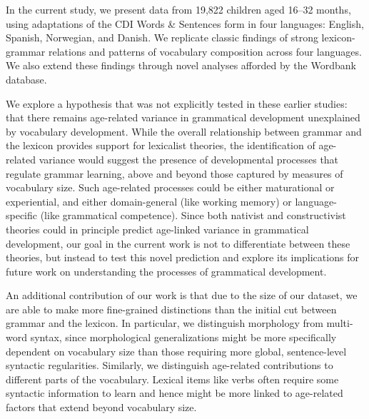 \documentclass[10pt,letterpaper]{article}
\begin{document}

In the current study, we present data from 19,822 children aged 16--32 months, using adaptations of the CDI Words \& Sentences form in four languages: English, Spanish, Norwegian, and Danish. We replicate classic findings of strong lexicon-grammar relations and patterns of vocabulary composition across four languages. We also extend these findings through novel analyses afforded by the Wordbank database. 

We explore a hypothesis that was not explicitly tested in these earlier studies: that there remains age-related variance in grammatical development unexplained by vocabulary development. While the overall relationship between grammar and the lexicon provides support for lexicalist theories, the identification of age-related variance would suggest the presence of developmental processes that regulate grammar learning, above and beyond those captured by measures of vocabulary size. Such age-related processes could be either maturational or experiential, and either domain-general (like working memory) or language-specific (like grammatical competence). Since both nativist and constructivist theories could in principle predict age-linked variance in grammatical development, our goal in the current work is not to differentiate between these theories, but instead to test this novel prediction and explore its implications for future work on understanding the processes of grammatical development. 

An additional contribution of our work is that due to the size of our dataset, we are able to make more fine-grained distinctions than the initial cut between grammar and the lexicon. In particular, we distinguish morphology from multi-word syntax, since morphological generalizations might be more specifically dependent on vocabulary size than those requiring more global, sentence-level syntactic regularities. Similarly, we distinguish age-related contributions to different parts of the vocabulary. Lexical items like verbs often require some syntactic information to learn \cite{gleitman1990} and hence might be more linked to age-related factors that extend beyond vocabulary size.
\end{document}
